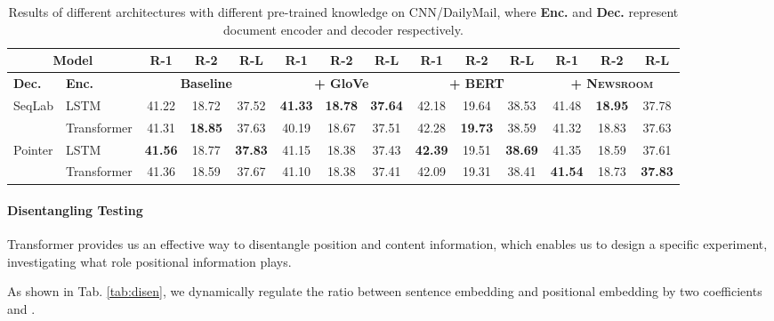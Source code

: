 \documentclass[11pt,a4paper]{article}
\begin{document}
\renewcommand\arraystretch{1.3}
\begin{table*}[t]
\center \footnotesize
{}
\begin{tabular}{llccc|ccc|ccc|ccc}
\toprule
\multicolumn{2}{c}{\textbf{Model}}  &
\textbf{R-1} & \textbf{R-2} & \textbf{R-L} &
\textbf{R-1} & \textbf{R-2} & \textbf{R-L} &
\textbf{R-1} & \textbf{R-2} & \textbf{R-L} &
\textbf{R-1} & \textbf{R-2} & \textbf{R-L} \\
\midrule
\textbf{Dec.} & \textbf{Enc.} &
\multicolumn{3}{c}{\textbf{Baseline}} &
\multicolumn{3}{c}{\textbf{+ GloVe}} &
\multicolumn{3}{c}{\textbf{+ BERT}} &
\multicolumn{3}{c}{\textbf{\textsc{+ Newsroom}}} \\
\cmidrule(lr){1-2} \cmidrule(lr){3-5} \cmidrule(lr){6-8} \cmidrule(lr){9-11} \cmidrule(lr){12-14}
\multirow{2}{*}{SeqLab}
& LSTM  & 41.22 & 18.72 & 37.52 & \textbf{41.33} & \textbf{18.78} & \textbf{37.64} & 42.18 & 19.64 & 38.53 & 41.48 & \textbf{18.95} & 37.78  \\
& Transformer  & 41.31 & \textbf{18.85} & 37.63 & 40.19 & 18.67 & 37.51 & 42.28 & \textbf{19.73} & 38.59 & 41.32 & 18.83 & 37.63   \\
\multirow{2}{*}{Pointer}
& LSTM & \textbf{41.56} & 18.77 & \textbf{37.83} & 41.15 & 18.38 & 37.43 & \textbf{42.39} & 19.51 & \textbf{38.69} & 41.35 & 18.59 & 37.61  \\
& Transformer   & 41.36 & 18.59 & 37.67 & 41.10 & 18.38 & 37.41 & 42.09 & 19.31 & 38.41 & \textbf{41.54} & 18.73 & \textbf{37.83}  \\



\bottomrule
\end{tabular}
\caption{
Results of different architectures with different pre-trained knowledge on CNN/DailyMail, where \textbf{Enc.} and \textbf{Dec.} represent document encoder and decoder respectively.
} \label{tab:pre-trained}
\end{table*}

\paragraph{Disentangling Testing} Transformer provides us an effective way to disentangle position  and content information, which enables us to design a specific experiment, investigating what role positional information plays.

As shown in Tab. \ref{tab:disen}, we dynamically regulate the ratio between sentence embedding and positional embedding by two coefficients  and .
\end{document}

